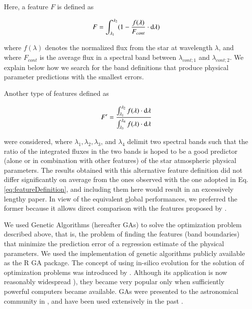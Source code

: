 Here, a feature $F$ is defined as

\begin{equation}\label{eq:featureDefinition}
  F = \int_{\lambda_{1}}^{\lambda_{2}} (1-\frac{f(\lambda)}{F_{cont}} \cdot {\rm d}{\lambda})
\end{equation}

where $f(\lambda)$ denotes the normalized flux from the star at
wavelength $\lambda$, and where $F_{cont}$ is the average flux in a
spectral band between $\lambda_{cont;1}$ and $\lambda_{cont;2}$. We
explain below how we search for the band definitions that produce
physical parameter predictions with the smallest errors.

Another type of features defined as

\begin{equation}\label{eq:feature2}
  F' = \frac{ \int_{\lambda_{1}}^{\lambda_{2}}f(\lambda) \cdot {\rm d}{\lambda}}
               {\int_{\lambda_{3}}^{\lambda_{4}} f(\lambda) \cdot {\rm d}{\lambda}} 
\end{equation}

were considered, where $\lambda_1, \lambda_2, \lambda_3$, and
$\lambda_4$ delimit two spectral bands such that the ratio of the
integrated fluxes in the two bands is hoped to be a good predictor
(alone or in combination with other features) of the star atmospheric
physical parameters. The results obtained with this alternative
feature definition did not differ significantly on average from the
ones observed with the one adopted in Eq. \ref{eq:featureDefinition},
and including them here would result in an excessively lengthy
paper. In view of the equivalent global performances, we preferred the
former because it allows direct comparison with the features proposed
by \cite{cesetti}.

We used Genetic Algorithms (hereafter GAs) to solve the optimization
problem described above, that is, the problem of finding the features
(band boundaries) that minimize the prediction error of a regression
estimate of the physical parameters. We used the implementation of
genetic algorithms publicly available as the R \citep{R2013} GA
package. The concept of using in-silico evolution for the solution of
optimization problems was introduced
by \cite{holland1975adaptation}. Although its application is now
reasonably widespread \citep[see e.g. ]{goldberg1989genetic}), they
became very popular only when sufficiently powerful computers became
available. GAs were presented to the astronomical community
in \cite{1995ApJS..101..309C}, and have been used extensively in the
past \citep[see][for the last application of GAs in astronomy at the
time of writing]{}.

